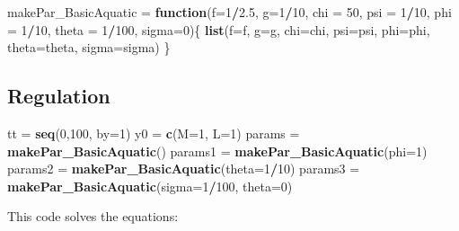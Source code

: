 \documentclass[
]{book}
\newenvironment{Shaded}{\begin{snugshade}}{\end{snugshade}}
\newcommand{\AttributeTok}[1]{\textcolor[rgb]{0.13,0.29,0.53}{#1}}
\newcommand{\ControlFlowTok}[1]{\textcolor[rgb]{0.13,0.29,0.53}{\textbf{#1}}}
\newcommand{\DecValTok}[1]{\textcolor[rgb]{0.00,0.00,0.81}{#1}}
\newcommand{\FloatTok}[1]{\textcolor[rgb]{0.00,0.00,0.81}{#1}}
\newcommand{\FunctionTok}[1]{\textcolor[rgb]{0.13,0.29,0.53}{\textbf{#1}}}
\newcommand{\NormalTok}[1]{#1}
\newcommand{\OtherTok}[1]{\textcolor[rgb]{0.56,0.35,0.01}{#1}}
\newcommand{\SpecialCharTok}[1]{\textcolor[rgb]{0.81,0.36,0.00}{\textbf{#1}}}
\begin{document}
\begin{Shaded}
\begin{Highlighting}[]
\NormalTok{makePar\_BasicAquatic }\OtherTok{=} \ControlFlowTok{function}\NormalTok{(}\AttributeTok{f=}\DecValTok{1}\SpecialCharTok{/}\FloatTok{2.5}\NormalTok{, }\AttributeTok{g=}\DecValTok{1}\SpecialCharTok{/}\DecValTok{10}\NormalTok{, }\AttributeTok{chi =} \DecValTok{50}\NormalTok{, }\AttributeTok{psi =} \DecValTok{1}\SpecialCharTok{/}\DecValTok{10}\NormalTok{, }\AttributeTok{phi =} \DecValTok{1}\SpecialCharTok{/}\DecValTok{10}\NormalTok{, }\AttributeTok{theta =} \DecValTok{1}\SpecialCharTok{/}\DecValTok{100}\NormalTok{, }\AttributeTok{sigma=}\DecValTok{0}\NormalTok{)\{}
  \FunctionTok{list}\NormalTok{(}\AttributeTok{f=}\NormalTok{f, }\AttributeTok{g=}\NormalTok{g, }\AttributeTok{chi=}\NormalTok{chi, }\AttributeTok{psi=}\NormalTok{psi, }\AttributeTok{phi=}\NormalTok{phi, }\AttributeTok{theta=}\NormalTok{theta, }\AttributeTok{sigma=}\NormalTok{sigma)}
\NormalTok{\}}
\end{Highlighting}
\end{Shaded}

\subsection{Regulation}\label{regulation-1}

\begin{Shaded}
\begin{Highlighting}[]
\NormalTok{tt }\OtherTok{=} \FunctionTok{seq}\NormalTok{(}\DecValTok{0}\NormalTok{,}\DecValTok{100}\NormalTok{, }\AttributeTok{by=}\DecValTok{1}\NormalTok{) }
\NormalTok{y0 }\OtherTok{=} \FunctionTok{c}\NormalTok{(}\AttributeTok{M=}\DecValTok{1}\NormalTok{, }\AttributeTok{L=}\DecValTok{1}\NormalTok{)}
\NormalTok{params }\OtherTok{=} \FunctionTok{makePar\_BasicAquatic}\NormalTok{()}
\NormalTok{params1 }\OtherTok{=} \FunctionTok{makePar\_BasicAquatic}\NormalTok{(}\AttributeTok{phi=}\DecValTok{1}\NormalTok{)}
\NormalTok{params2 }\OtherTok{=} \FunctionTok{makePar\_BasicAquatic}\NormalTok{(}\AttributeTok{theta=}\DecValTok{1}\SpecialCharTok{/}\DecValTok{10}\NormalTok{)}
\NormalTok{params3 }\OtherTok{=} \FunctionTok{makePar\_BasicAquatic}\NormalTok{(}\AttributeTok{sigma=}\DecValTok{1}\SpecialCharTok{/}\DecValTok{100}\NormalTok{, }\AttributeTok{theta=}\DecValTok{0}\NormalTok{)}
\end{Highlighting}
\end{Shaded}

This code solves the equations:
\end{document}
